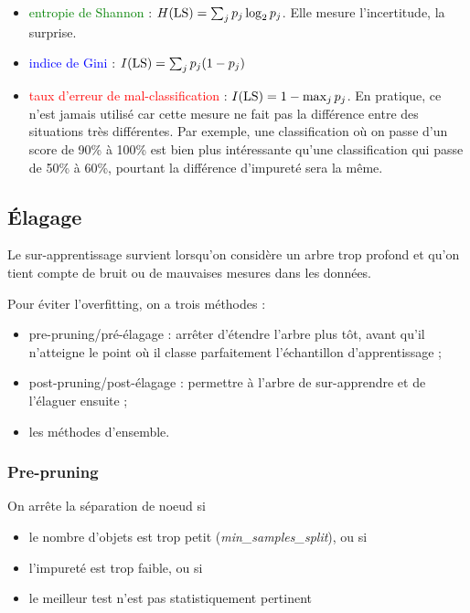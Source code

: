 		\begin{itemize}
			\item \textcolor{green}{entropie de Shannon} : $H(\text{LS}) = \sum_j p_j \log_2 p_j$. Elle mesure l'incertitude, la surprise.
			
			\item \textcolor{blue}{indice de Gini} : $I(\text{LS}) = \sum_j p_j(1 - p_j)$
			\item \textcolor{red}{taux d'erreur de mal-classification} : $I(\text{LS}) = 1 - \max_j p_j$. En pratique, ce n'est jamais utilisé car cette mesure ne fait pas la différence entre des situations très différentes. Par exemple, une classification où on passe d'un score de 90\% à 100\% est bien plus intéressante qu'une classification qui passe de 50\% à 60\%, pourtant la différence d'impureté sera la même.
			
		\end{itemize}
		
			
	\subsection{Élagage}

	Le sur-apprentissage survient lorsqu'on considère un arbre trop profond et qu'on tient compte de bruit ou de mauvaises mesures dans les données.
	
	
	Pour éviter l'overfitting, on a trois méthodes :
	
	\begin{itemize}
		\item pre-pruning/pré-élagage : arrêter d'étendre l'arbre plus tôt, avant qu'il n'atteigne le point où il classe parfaitement l'échantillon d'apprentissage ;
		\item post-pruning/post-élagage : permettre à l'arbre de sur-apprendre et de l'élaguer ensuite ;
		\item les méthodes d'ensemble.
	\end{itemize}
	
	
	
		\subsubsection{Pre-pruning}
		
		On arrête la séparation de noeud si
		
		\begin{itemize}
			\item le nombre d'objets est trop petit (\textit{min\_samples\_split}), ou si
			\item l'impureté est trop faible, ou si
			\item le meilleur test n'est pas statistiquement pertinent
		\end{itemize}
		
